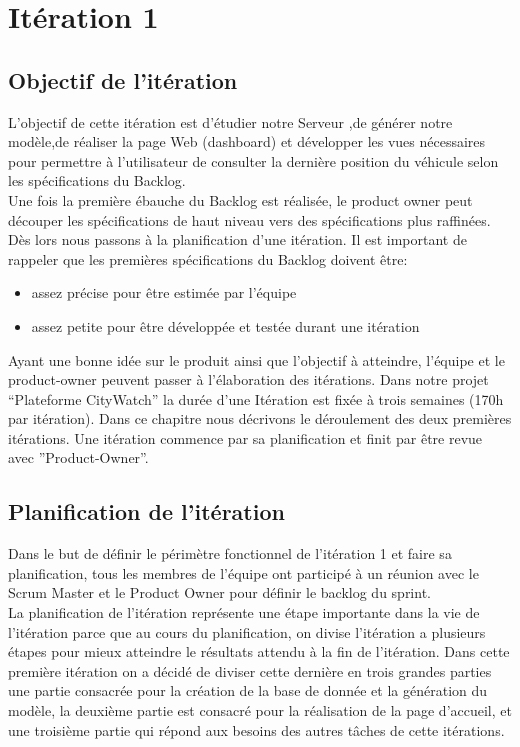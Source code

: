 \section{Itération 1}

\subsection{Objectif de l'itération}
L'objectif de cette itération est d'étudier notre Serveur ,de générer notre modèle,de réaliser
la page Web (dashboard) et développer les vues nécessaires pour permettre à l'utilisateur
de consulter la dernière position du véhicule selon les spécifications du Backlog.\\
Une fois la première ébauche du Backlog est réalisée, le product owner peut découper
les spécifications de haut niveau vers des spécifications plus raffinées. Dès lors nous
passons à la planification d’une itération. Il est important de rappeler que les premières
spécifications du Backlog doivent être:
\begin{itemize}
 \item assez précise pour être estimée par l’équipe
 \item assez petite pour être développée et testée durant une itération
\end{itemize}
Ayant une bonne idée sur le produit ainsi que l’objectif à atteindre, l’équipe et le
product-owner peuvent passer à l’élaboration des itérations.
Dans notre projet ``Plateforme CityWatch'' la durée d’une Itération est fixée à trois
semaines (170h par itération). Dans ce chapitre nous décrivons le déroulement des deux
premières itérations. Une itération commence par sa planification et finit par être revue
avec ”Product-Owner”.

\subsection{Planification de l'itération}

Dans le but de définir le périmètre fonctionnel de l'itération 1 et faire
sa planification, tous les membres de l'équipe ont participé à un réunion
avec le Scrum Master et le Product Owner pour définir le backlog du sprint.\\

La planification de l'itération représente une étape importante dans la vie de
l'itération parce que au cours du planification, on divise l'itération a plusieurs étapes
pour mieux atteindre le résultats attendu à la fin de l'itération.
Dans cette première itération on a décidé de diviser cette dernière en trois grandes
parties une partie consacrée pour la création de la base de donnée et la génération du
modèle, la deuxième partie est consacré pour la réalisation de la page d’accueil, et une
troisième partie qui répond aux besoins des autres tâches de cette itérations.

